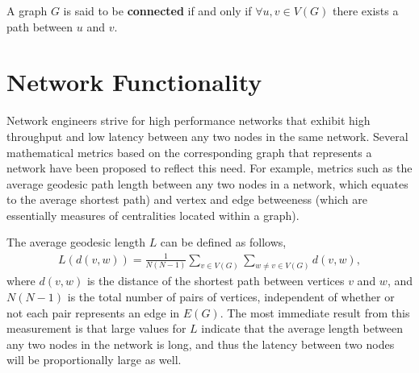 \documentclass[11pt]{article}
\begin{document}
\begin{define}
A graph $G$ is said to be \textbf{connected} if and only if $\forall u,v \in V(G)$ there exists a path between $u$ and $v$.
\end{define}


\section{Network Functionality}
\label{NetworkFunctionality}

Network engineers strive for high performance networks that exhibit high throughput and low 
latency between any two nodes in the same network. Several mathematical metrics based on
the corresponding graph that represents a network have been proposed to reflect this need. 
For example, metrics such as the average geodesic path length between any two nodes in a network, which equates to the average shortest path) and vertex and edge betweeness (which are essentially measures of centralities located within a graph). 

The average geodesic length $L$ can be defined as follows,
\begin{eqnarray*}
L(d(v,w)) = \frac{1}{N(N-1)}\sum_{v \in V(G)}\sum_{w \not= v \in V(G)} d(v,w),
\end{eqnarray*}
where $d(v,w)$ is the distance of the shortest path between vertices $v$ and $w$, and $N(N-1)$ is the total number of pairs of vertices, independent of whether or not each pair represents an edge in $E(G)$. The most immediate result from this measurement is that large values for $L$ indicate that the average length between any two nodes in the network is long, and thus the latency between two nodes will be proportionally large as well. 
\end{document}
